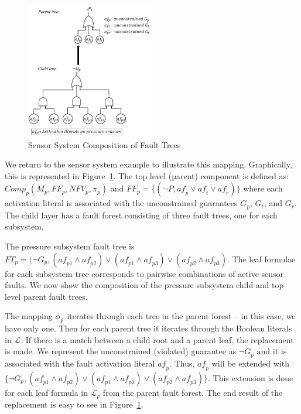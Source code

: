 
\begin{figure}[h!]
	\begin{center}
		\includegraphics[width=0.5\textwidth]{images/faultCompEx.JPG}
	\end{center}
	\caption{Sensor System Composition of Fault Trees}
	\label{fig:sensorSysComp}
\end{figure}
We return to the sensor system example to illustrate this mapping. Graphically, this is represented in Figure~\ref{fig:sensorSysComp}.  The top level (parent) component is defined as: $\mathit{Comp}_p (M_p, \mathit{FF}_p, \mathit{NFV}_p, \pi_p)$ and $\mathit{FF}_p = \{(\neg P, \mathit{af}_p \lor \mathit{af}_t \lor \mathit{af}_r)\}$ where each activation literal is associated with the unconstrained guarantees $G_p$, $G_t$, and $G_r$. The child layer has a fault forest consisting of three fault trees, one for each subsystem. 

The pressure subsystem fault tree is $\mathit{FT}_{p} = (\neg G_p, (\mathit{af}_{p1} \land \mathit{af}_{p2}) \lor (\mathit{af}_{p1} \land \mathit{af}_{p3}) \lor (\mathit{af}_{p2} \land \mathit{af}_{p3}) $. The leaf formulae for each subsystem tree corresponds to pairwise combinations of active sensor faults. We now show the composition of the pressure subsystem child and top level parent fault trees. 

The mapping $\phi_F$ iterates through each tree in the parent forest -- in this case, we have only one. Then for each parent tree it iterates through the Boolean literals in $\mathcal{L}$. If there is a match between a child root and a parent leaf, the replacement is made. We represent the unconstrained (violated) guarantee as $\neg G_p$ and it is associated with the fault activation literal $\mathit{af}_p$. Thus, $\mathit{af}_p$ will be extended with $\{\neg G_p, (\mathit{af}_{p1} \land \mathit{af}_{p2}) \lor (\mathit{af}_{p1} \land \mathit{af}_{p3}) \lor (\mathit{af}_{p2} \land \mathit{af}_{p3})\}$. This extension is done for each leaf formula in $\mathcal{L}_p$ from the parent fault forest. The end result of the replacement is easy to see in Figure~\ref{fig:sensorSysComp}.



